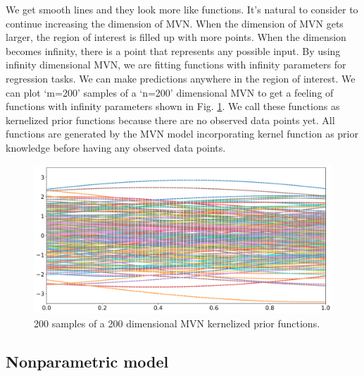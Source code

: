 \documentclass[12pt,letterpaper,fleqn,oneside,titlepage]{offroad-report}
\begin{document}
We get smooth lines and they look more like functions. It's natural to consider to continue increasing the dimension of MVN. When the dimension of MVN gets larger, the region of interest is filled up with more points. When the dimension becomes infinity, there is a point that represents any possible input. By using infinity dimensional MVN, we are fitting functions with infinity parameters for regression tasks. We can make predictions anywhere in the region of interest. We can plot `m=200' samples of a `n=200' dimensional MVN to get a feeling of functions with infinity parameters shown in Fig. \ref{FIG:8}. We call these functions as kernelized prior functions because there are no observed data points yet. All functions are generated by the MVN model incorporating kernel function as prior knowledge before having any observed data points. 
\begin{figure}[h!]
	\centering
		\includegraphics[width=13.0cm]{figs/200d_gaussian_kernel_prior.png}
	\caption{200 samples of a 200 dimensional MVN kernelized prior functions.}
	\label{FIG:8}
\end{figure}

\subsection{Nonparametric model}
\end{document}
